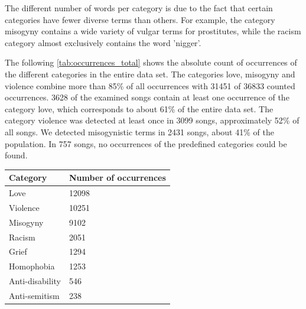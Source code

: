 The different number of words per category is due to the fact that certain categories have fewer diverse terms than others. For example, the category misogyny contains a wide variety of vulgar terms for prostitutes, while the racism category almost exclusively contains the word 'nigger'.

The following \autoref{tab:occurrences_total} shows the absolute count of occurrences of the different categories in the entire data set. The categories love, misogyny and violence combine more than 85\% of all occurrences with 31451 of 36833 counted occurrences. 3628 of the examined songs contain at least one occurrence of the category love, which corresponds to about 61\% of the entire data set. The category violence was detected at least once in 3099 songs, approximately 52\% of all songs. We detected misogynistic terms in 2431 songs, about 41\% of the population. In 757 songs, no occurrences of the predefined categories could be found.

\begin{table}[!htb]
    \centering
    \begin{tabular}{|l|l|}
    \hline
    \textbf{Category} & \textbf{Number of occurrences} \\ \hline
    Love              & 12098                          \\ \hline
    Violence          & 10251                          \\ \hline
    Misogyny          & 9102                           \\ \hline
    Racism            & 2051                           \\ \hline
    Grief             & 1294                           \\ \hline
    Homophobia        & 1253                           \\ \hline
    Anti-disability   & 546                            \\ \hline
    Anti-semitism     & 238                            \\ \hline
    \end{tabular}
    \label{tab:occurrences_total}
\end{table}


